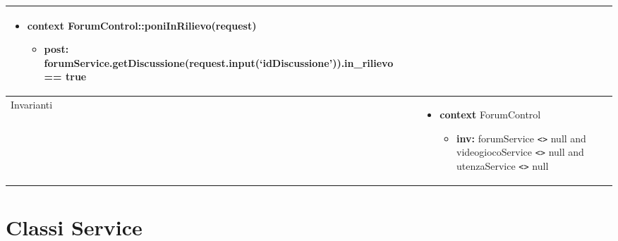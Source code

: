 \begin{tabular}{|| l | p{28em} ||}
\begin{itemize}[leftmargin=*]
	\item \textbf{context} ForumControl::poniInRilievo(request)
	\begin{itemize}
		\item[ ] \textbf{post:} forumService\newline .getDiscussione(request.input(‘idDiscussione’)).in\_rilievo == true
	\end{itemize}
\end{itemize}\\
\hline
Invarianti & \begin{itemize}
	\item \textbf{context} ForumControl
	\begin{itemize}
		\item[ ] \textbf{inv:} forumService \verb|<>| null and videogiocoService \verb|<>| null and utenzaService \verb|<>| null
	\end{itemize}
\end{itemize}\\
\hline
\end{tabular}

\newpage
\section{Classi Service}
